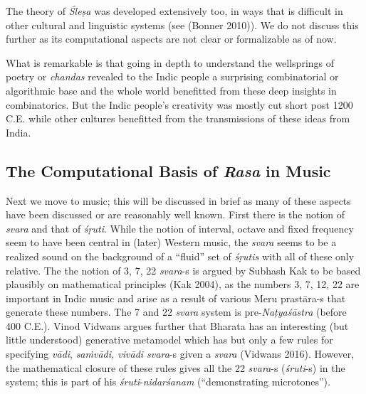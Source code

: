 The theory of \textsl{Śleṣa} was developed extensively too, in ways that is difficult in other cultural and linguistic systems (see (Bonner 2010)). We do not discuss this further as its computational aspects are not clear or formalizable as of now.

What is remarkable is that going in depth to understand the wellsprings of poetry or \textsl{chandas} revealed to the Indic people a surprising combinatorial or algorithmic base and the whole world benefitted from these deep insights in combinatorics. But the Indic people’s creativity was mostly cut short post 1200 C.E. while other cultures benefitted from the transmissions of these ideas from India.

\subsection{The Computational Basis of \textsl{Rasa} in Music}\label{chap3-sec5.2}

Next we move to music; this will be discussed in brief as many of these aspects have been discussed or are reasonably well known. First there is the notion of \textsl{svara} and that of \textsl{śṛuti}. While the notion of interval, octave and fixed frequency seem to have been central in (later) Western music, the \textsl{svara} seems to be a realized sound on the background of a “fluid” set of \textsl{śṛutis} with all of these only relative. The the notion of 3, 7, 22 \textsl{svara}-s is argued by Subhash Kak to be based plausibly on mathematical principles (Kak 2004), as the numbers 3, 7, 12, 22 are important in Indic music and arise as a result of various Meru prastāra-s that generate these numbers. The 7 and 22 \textsl{svara} system is pre-\textsl{Naṭyaśāstra} (before 400 C.E.). Vinod Vidwans argues further that Bharata has an interesting (but little understood) generative metamodel which has but only a few rules for specifying \textsl{vādi}, \textsl{saṁvādi, vivādi svara}-s given a \textsl{svara} (Vidwans 2016). However, the mathematical closure of these rules gives all the 22 \textsl{svara}-s (\textsl{śruti}-s) in the system; this is part of his \textsl{śruti}-\textsl{nidarśanam} (“demonstrating microtones”).

